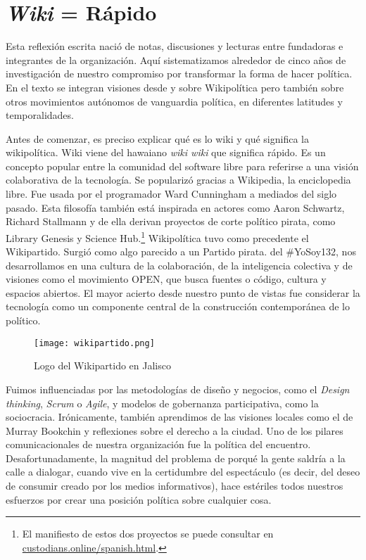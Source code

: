 \chapter{\emph{Wiki} = Rápido}
\label{cha:wiki}

Esta reflexión escrita nació de notas, discusiones y lecturas entre fundadoras e integrantes de la organización. Aquí sistematizamos alrededor de cinco años de investigación de nuestro compromiso por transformar la forma de hacer política. En el texto se integran visiones desde y sobre Wikipolítica pero también sobre otros movimientos autónomos de vanguardia política, en diferentes latitudes y temporalidades.

Antes de comenzar, es preciso explicar qué es lo wiki y qué significa la wikipolítica. Wiki viene del hawaiano \emph{wiki wiki} que significa rápido. Es un concepto popular entre la comunidad del software libre para referirse a una visión colaborativa de la tecnología. Se popularizó gracias a Wikipedia, la enciclopedia libre. Fue usada por el programador Ward Cunningham a mediados del siglo pasado. Esta filosofía también está inspirada en actores como Aaron Schwartz, Richard Stallmann y de ella derivan proyectos de corte político pirata, como Library Genesis y Science Hub.\footnote{El manifiesto de estos dos proyectos se puede consultar en \url{custodians.online/spanish.html}.} Wikipolítica tuvo como precedente el Wikipartido. Surgió como algo parecido a un Partido pirata.  del \#YoSoy132, nos desarrollamos en una cultura de la colaboración, de la inteligencia colectiva y de visiones como el movimiento OPEN,\addref{} que busca fuentes o código, cultura y espacios abiertos. El mayor acierto desde nuestro punto de vistas fue considerar la tecnología como un componente central de la construcción contemporánea de lo político.

\begin{figure}[htbp]
	\centering
	\texttt{[image: wikipartido.png]}
	\caption{Logo del Wikipartido en Jalisco}
	\label{fig:wikilogo}
\end{figure}

Fuimos influenciadas	 por las metodologías de diseño y negocios, como el \emph{Design thinking}, \emph{Scrum} o \emph{Agile}, y modelos de gobernanza participativa, como la sociocracia. Irónicamente, también aprendimos de las visiones locales como el  de Murray Bookchin\addref{} y reflexiones sobre el derecho a la ciudad.\addref{} Uno de los pilares comunicacionales de nuestra organización fue la política del encuentro. Desafortunadamente, la magnitud del problema de porqué la gente saldría a la calle a dialogar, cuando vive en la certidumbre del espectáculo (es decir, del deseo de consumir creado por los medios informativos), hace estériles todos nuestros esfuerzos por crear una posición política sobre cualquier cosa.

